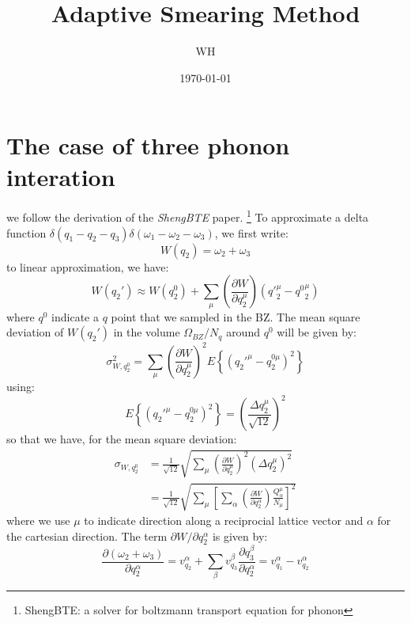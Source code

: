 \documentclass{article}
\newcommand{\pfrac}[2]{\frac{\partial #1}{\partial #2}}
\begin{document}
\title{Adaptive Smearing Method}
\author{WH}
\date{\today}
\maketitle

\section{The case of three phonon interation}
we follow the derivation of the \emph{ShengBTE} paper. 
\footnote{ShengBTE: a solver for boltzmann transport equation for phonon}
To approximate a delta function $\delta(q_1 - q_2 -q_3)\delta(\omega_1 - \omega_2 - \omega_3)$, we 
first write:
\begin{equation}
    W(q_2) = \omega_2 + \omega_3
\end{equation}
to linear approximation, we have:
\begin{equation}
    W(q_2') \approx W(q_2^0) + \sum_\mu \left( \pfrac{W}{q_2^{\mu}} \right) \left( {q'}_2^{\mu} - {q^0}_2^{\mu}\right) \label{3ph}
\end{equation}
where $q^0$ indicate a $q$ point that we sampled in the BZ. The mean square deviation of $W(q_2')$
in the volume $\Omega_{BZ} / N_q$ around $q^0$ will be given by:
\begin{equation}
    \sigma^2_{W,q_2^0} = \sum_\mu \left( \pfrac{W}{q_2^{\mu}} \right)^2 E\left\{ \left( q_2'^{\mu} - q_2^{0\mu}\right)^2 \right\}
\end{equation}
using:
\begin{equation}
    E\left\{ \left( q_2'^{\mu} - q_2^{0\mu}\right)^2 \right\} 
        = \left( \frac{ \Delta q_2^{\mu} }{\sqrt{12}} \right)^2
\end{equation}
so that we have, for the mean square deviation:
\begin{align}
    \sigma_{W,q_2^0} &= \frac{1}{\sqrt{12}} \sqrt{ \sum_\mu \left( \pfrac{W}{q_2^{\mu}} \right)^2
                            ( \Delta q_2^{\mu} )^2  } \\
        &= \frac{1}{\sqrt{12}} \sqrt{ \sum_\mu \left[ \sum_{\alpha}\left( \pfrac{W}{q_2^{\alpha}} \right)
                 \frac{Q_{\alpha}^{\mu}}{ N_{\mu}}  \right]^2  }
\end{align}
where we use $\mu$ to indicate direction along a reciprocial lattice vector 
and $\alpha$ for the cartesian direction.
The term $ \partial W / \partial q_2^{\alpha}$ is given by:
\begin{equation}
   \frac{ \partial(\omega_2 + \omega_3) } {\partial q_2^{\alpha} } 
    = v_{q_2}^{\alpha} + \sum_{\beta} v_{q_3}^{\beta} \frac{\partial q_3^{\beta}}{\partial q_2^{\alpha}}
    = v_{q_1}^{\alpha} - v_{q_2}^{\alpha}
\end{equation}
\end{document}
